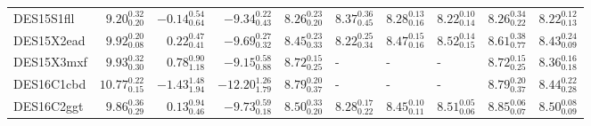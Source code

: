 \documentclass[fleqn,usenatbib,]{mnras}
\begin{document}
\begin{table}
\begin{threeparttable}
\begin{tabular}{lrrrllllll}
DES15S1fll  &   $9.20 _{\scriptscriptstyle 0.20} ^{\scriptscriptstyle 0.32}$ &  $-0.14 _{\scriptscriptstyle 0.64} ^{\scriptscriptstyle 0.54}$ &   $-9.34 _{\scriptscriptstyle 0.43} ^{\scriptscriptstyle 0.22}$ &  $8.26 _{\scriptscriptstyle 0.20} ^{\scriptscriptstyle 0.23}$ &  $8.37 _{\scriptscriptstyle 0.45} ^{\scriptscriptstyle 0.36}$ &  $8.28 _{\scriptscriptstyle 0.16} ^{\scriptscriptstyle 0.13}$ &  $8.22 _{\scriptscriptstyle 0.14} ^{\scriptscriptstyle 0.10}$ &  $8.26 _{\scriptscriptstyle 0.22} ^{\scriptscriptstyle 0.34}$ &  $8.22 _{\scriptscriptstyle 0.13} ^{\scriptscriptstyle 0.12}$ \\
DES15X2ead  &   $9.92 _{\scriptscriptstyle 0.08} ^{\scriptscriptstyle 0.20}$ &   $0.22 _{\scriptscriptstyle 0.41} ^{\scriptscriptstyle 0.47}$ &   $-9.69 _{\scriptscriptstyle 0.32} ^{\scriptscriptstyle 0.27}$ &  $8.45 _{\scriptscriptstyle 0.33} ^{\scriptscriptstyle 0.23}$ &  $8.22 _{\scriptscriptstyle 0.34} ^{\scriptscriptstyle 0.25}$ &  $8.47 _{\scriptscriptstyle 0.16} ^{\scriptscriptstyle 0.15}$ &  $8.52 _{\scriptscriptstyle 0.15} ^{\scriptscriptstyle 0.14}$ &  $8.61 _{\scriptscriptstyle 0.77} ^{\scriptscriptstyle 0.38}$ &  $8.43 _{\scriptscriptstyle 0.09} ^{\scriptscriptstyle 0.24}$ \\
DES15X3mxf  &   $9.93 _{\scriptscriptstyle 0.30} ^{\scriptscriptstyle 0.32}$ &   $0.78 _{\scriptscriptstyle 1.18} ^{\scriptscriptstyle 0.90}$ &   $-9.15 _{\scriptscriptstyle 0.88} ^{\scriptscriptstyle 0.58}$ &  $8.72 _{\scriptscriptstyle 0.25} ^{\scriptscriptstyle 0.15}$ &                                                             - &                                                             - &                                                             - &  $8.72 _{\scriptscriptstyle 0.25} ^{\scriptscriptstyle 0.15}$ &  $8.36 _{\scriptscriptstyle 0.18} ^{\scriptscriptstyle 0.16}$ \\
DES16C1cbd  &  $10.77 _{\scriptscriptstyle 0.15} ^{\scriptscriptstyle 0.22}$ &  $-1.43 _{\scriptscriptstyle 1.94} ^{\scriptscriptstyle 1.48}$ &  $-12.20 _{\scriptscriptstyle 1.79} ^{\scriptscriptstyle 1.26}$ &  $8.79 _{\scriptscriptstyle 0.37} ^{\scriptscriptstyle 0.20}$ &                                                             - &                                                             - &                                                             - &  $8.79 _{\scriptscriptstyle 0.37} ^{\scriptscriptstyle 0.20}$ &  $8.44 _{\scriptscriptstyle 0.28} ^{\scriptscriptstyle 0.22}$ \\
DES16C2ggt  &   $9.86 _{\scriptscriptstyle 0.29} ^{\scriptscriptstyle 0.36}$ &   $0.13 _{\scriptscriptstyle 0.46} ^{\scriptscriptstyle 0.94}$ &   $-9.73 _{\scriptscriptstyle 0.18} ^{\scriptscriptstyle 0.59}$ &  $8.50 _{\scriptscriptstyle 0.20} ^{\scriptscriptstyle 0.33}$ &  $8.28 _{\scriptscriptstyle 0.22} ^{\scriptscriptstyle 0.17}$ &  $8.45 _{\scriptscriptstyle 0.11} ^{\scriptscriptstyle 0.10}$ &  $8.51 _{\scriptscriptstyle 0.06} ^{\scriptscriptstyle 0.05}$ &  $8.85 _{\scriptscriptstyle 0.07} ^{\scriptscriptstyle 0.06}$ &  $8.50 _{\scriptscriptstyle 0.09} ^{\scriptscriptstyle 0.08}$ \\

\end{tabular}
\end{threeparttable}
\end{table}
\end{document}
